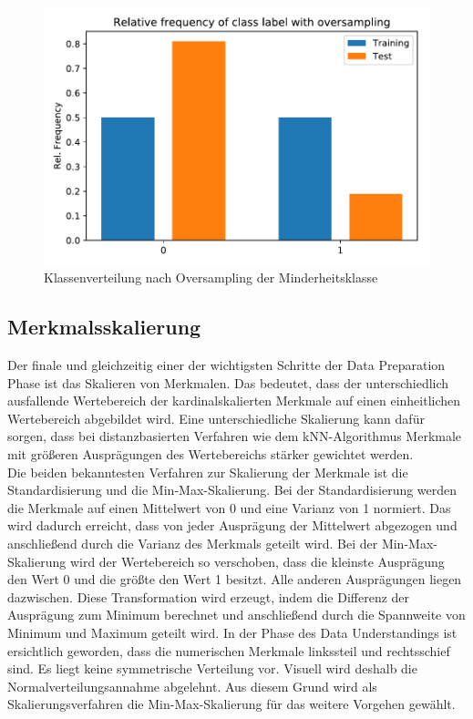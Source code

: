 \begin{figure}[!htbp]
\begin{center}
\includegraphics[scale=0.5]{pdf/classDistOver.pdf}
\end{center}
\caption{Klassenverteilung nach Oversampling der Minderheitsklasse}
\label{fig:over}
\end{figure}

\FloatBarrier

\subsection{Merkmalsskalierung}
\label{sec:Skalierung}

Der finale und gleichzeitig einer der wichtigsten Schritte der Data Preparation Phase ist das Skalieren von Merkmalen. Das bedeutet, dass der unterschiedlich ausfallende Wertebereich der kardinalskalierten Merkmale auf einen einheitlichen Wertebereich abgebildet wird. Eine unterschiedliche Skalierung kann dafür sorgen, dass bei distanzbasierten Verfahren wie dem kNN-Algorithmus Merkmale mit größeren Ausprägungen des Wertebereichs stärker gewichtet werden.\\

Die beiden bekanntesten Verfahren zur Skalierung der Merkmale ist die Standardisierung und die Min-Max-Skalierung. Bei der Standardisierung werden die Merkmale auf einen Mittelwert von 0 und eine Varianz von 1 normiert. Das wird dadurch erreicht, dass von jeder Ausprägung der Mittelwert abgezogen und anschließend durch die Varianz des Merkmals geteilt wird. Bei der Min-Max-Skalierung wird der Wertebereich so verschoben, dass die kleinste Ausprägung den Wert 0 und die größte den Wert 1 besitzt. Alle anderen Ausprägungen liegen dazwischen. Diese Transformation wird erzeugt, indem die Differenz der Ausprägung zum Minimum berechnet und anschließend durch die Spannweite von Minimum und Maximum geteilt wird. In der Phase des Data Understandings ist ersichtlich geworden, dass die numerischen Merkmale linkssteil und rechtsschief sind. Es liegt keine symmetrische Verteilung vor. Visuell wird deshalb die Normalverteilungsannahme abgelehnt. Aus diesem Grund wird als Skalierungsverfahren die Min-Max-Skalierung für das weitere Vorgehen gewählt.
\pagebreak

